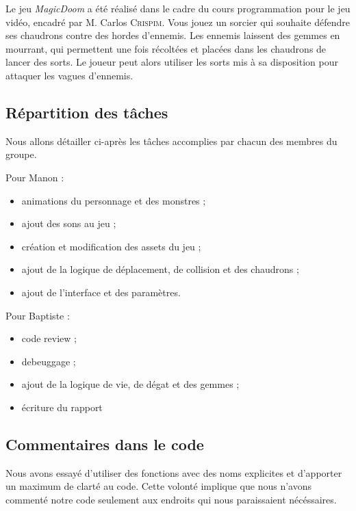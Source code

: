 Le jeu \textit{MagicDoom} a été réalisé dans le cadre du cours programmation pour le jeu vidéo, encadré par M. Carlos \textsc{Crispim}. Vous jouez un sorcier qui souhaite défendre ses chaudrons contre des hordes d'ennemis. Les ennemis laissent des gemmes en mourrant, qui permettent une fois récoltées et placées dans les chaudrons de lancer des sorts. Le joueur peut alors utiliser les sorts mis à sa disposition pour attaquer les vagues d'ennemis.

\subsection{Répartition des tâches}

Nous allons détailler ci-après les tâches accomplies par chacun des membres du groupe.

Pour Manon :
\begin{itemize}
    \item animations du personnage et des monstres ;
    \item ajout des sons au jeu ;
    \item création et modification des assets du jeu ;
    \item ajout de la logique de déplacement, de collision et des chaudrons ;
    \item ajout de l'interface et des paramètres.

\end{itemize}

Pour Baptiste :
\begin{itemize}
    \item code review ;
    \item debeuggage ;
    \item ajout de la logique de vie, de dégat et des gemmes ;
    \item écriture du rapport
\end{itemize}

\subsection{Commentaires dans le code}

Nous avons essayé d'utiliser des fonctions avec des noms explicites et d'apporter un maximum de clarté au code. Cette volonté implique que nous n'avons commenté notre code seulement aux endroits qui nous paraissaient nécéssaires.